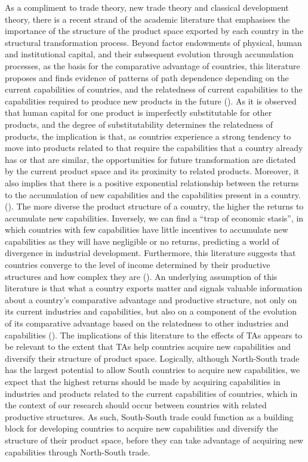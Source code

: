 %
As a compliment to trade theory, new trade theory and classical
development theory, there is a recent strand of the academic literature
that emphasises the importance of the structure of the product space
exported by each country in the structural transformation process.
Beyond factor endowments of physical, human and institutional capital,
and their subsequent evolution through accumulation processes, as the
basis for the comparative advantage of countries, this literature
proposes and finds evidence of patterns of path dependence depending on
the current capabilities of countries, and the relatedness of current
capabilities to the capabilities required to produce new products in the
future (\cite{hausmann_structure_2007}). As it is observed that human
capital for one product is imperfectly substitutable for other products,
and the degree of substitutability determines the relatedness of
products, the implication is that, as countries experience a strong
tendency to move into products related to that require the capabilities
that a country already has or that are similar, the opportunities for
future transformation are dictated by the current product space and its
proximity to related products. Moreover, it also implies that there is a
positive exponential relationship between the returns to the
accumulation of new capabilities and the capabilities present in a
country. (\cite{hausmann_country_2010}). The more diverse the product
structure of a country, the higher the returns to accumulate new
capabilities. Inversely, we can find a ``trap of economic stasis'', in
which countries with few capabilities have little incentives to
accumulate new capabilities as they will have negligible or no returns,
predicting a world of divergence in industrial development. Furthermore,
this literature suggests that countries converge to the level of income
determined by their productive structures and how complex they are
(\cite{hidalgo_building_2009}). An underlying assumption of this
literature is that what a country exports matter and signals valuable
information about a country's comparative advantage and productive
structure, not only on its current industries and capabilities, but also
on a component of the evolution of its comparative advantage based on
the relatedness to other industries and capabilities (\cite{hausmann_implied_2014}). 
The implications of this literature to the effects of TAs
appears to be relevant to the extent that TAs help countries acquire new
capabilities and diversify their structure of product space. Logically,
although North-South trade has the largest potential to allow South
countries to acquire new capabilities, we expect that the highest
returns should be made by acquiring capabilities in industries and
products related to the current capabilities of countries, which in the
context of our research should occur between countries with related
productive structures. As such, South-South trade could function as a
building block for developing countries to acquire new capabilities and
diversify the structure of their product space, before they can take
advantage of acquiring new capabilities through North-South trade.
%
